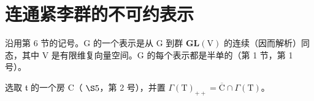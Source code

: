 \section{连通紧李群的不可约表示}

沿用第 6 节的记号。G 的一个表示是从 G 到群 \(\mathbf{GL}(\mathrm{V})\) 的连续（因而解析）同态，其中 V 是有限维复向量空间。G 的每个表示都是半单的（第 1 节，第 1 号）。

选取 \(\mathfrak{t}\) 的一个房 C（ \(\S 5\)，第 2 号），并置 \(\Gamma(\mathrm{T})_{++} = \overline{\mathrm{C}} \cap \Gamma(\mathrm{T})\)。

